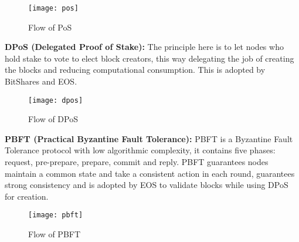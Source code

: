 \begin{figure}[h]
	\centering
	\texttt{[image: pos]}
	\caption{Flow of PoS}
	\label{fig:pos}
\end{figure}


\textbf{DPoS (Delegated Proof of Stake):} The principle here is to let nodes who
hold stake to vote to elect block creators, this way delegating the job of creating
the blocks and reducing computational consumption. This is adopted by BitShares and EOS.

\begin{figure}[h]
	\centering
	\texttt{[image: dpos]}
	\caption{Flow of DPoS}
	\label{fig:dpos}
\end{figure}

\textbf{PBFT (Practical Byzantine Fault Tolerance):} PBFT is a Byzantine Fault 
Tolerance protocol with low algorithmic complexity, it contains five phases: request,
pre-prepare, prepare, commit and reply. PBFT guarantees nodes maintain a common state and take
a consistent action in each round, guarantees strong consistency and is adopted by
EOS to validate blocks while using DPoS for creation.

\begin{figure}[h]
	\centering
	\texttt{[image: pbft]}
	\caption{Flow of PBFT}
	\label{fig:pbft}
\end{figure}